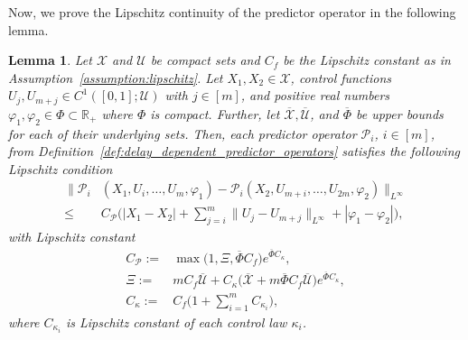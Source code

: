 \documentclass[letterpaper, 10 pt, conference]{ieeeconf}  %
\newtheorem{lemma}[theorem]{Lemma}
\begin{document}
Now, we prove the Lipschitz continuity of the predictor operator in the following lemma.

\begin{lemma}\label{lemma:predictor-continuity}
Let $\mathcal{X}$ and $\mathcal{U}$ be compact sets and $C_f$ be the Lipschitz constant as in Assumption~\ref{assumption:lipschitz}. Let $X_1, X_2 \in \mathcal{X}$, control functions $U_j, U_{m+j} \in C^1([0,1];\mathcal{U})$ with $j \in [m]$, and positive real numbers $\varphi_1, \varphi_2 \in \Phi \subset \mathbb{R}_+$ where $\Phi$ is compact. Further, let $\overline{\mathcal{X}}, \overline{\mathcal{U}}$, and $\overline{\Phi}$ be upper bounds for each of their underlying sets. Then, each predictor operator $\mathcal{P}_i$, $i \in [m]$, from Definition~\ref{def:delay_dependent_predictor_operators} satisfies the following Lipschitz condition
\begin{align}
    \bigg\| \mathcal{P}_i&(X_1,U_i,\dots,U_m,\varphi_1) - \mathcal{P}_i(X_2,U_{m+i},\dots,U_{2m},\varphi_2) \bigg\|_{L^\infty} \nonumber  \\
    \leq& C_{\mathcal{P}} \Biggl( |X_1 - X_2| + \sum_{j=i}^m \bigg\| U_j - U_{m+j} \bigg\|_{L^\infty} 
    + |\varphi_1 - \varphi_2| \Biggr), \label{eq:predictor_lipschitz_inequality}
\end{align}
with Lipschitz constant
\begin{align}
    C_{\mathcal{P}} :=& \max \bigg( 1, \Xi, \overline{\Phi} C_f \bigg) e^{\overline{\Phi} C_{\kappa}}, \\ 
    \Xi  :=& m C_f \overline{\mathcal{U}} + C_{\kappa} \bigg( \overline{\mathcal{X}} + m \overline{\Phi} C_f \overline{\mathcal{U}} \bigg) e^{\overline{\Phi} C_{\kappa}}, \\
    C_{\kappa}  :=& C_f \bigg( 1 + \sum_{i=1}^m C_{\kappa_i} \bigg), \label{eq:c_kappa}
\end{align}
where $C_{\kappa_i}$ is Lipschitz constant of each control law $\kappa_i$.
\end{lemma}
\end{document}
